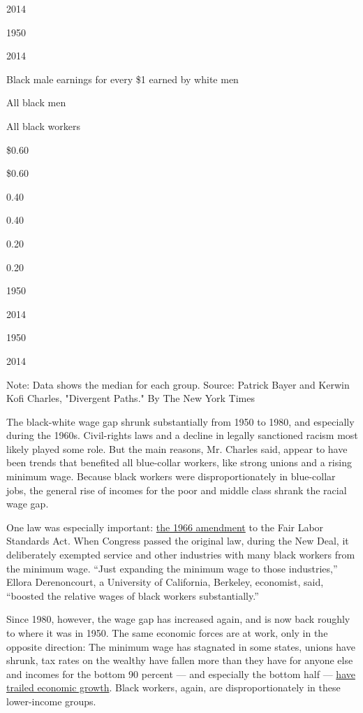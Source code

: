 2014

1950

2014

Black male earnings for every \$1 earned by white men

All black men

All black workers

\$0.60

\$0.60

0.40

0.40

0.20

0.20

1950

2014

1950

2014

Note: Data shows the median for each group. Source: Patrick Bayer and
Kerwin Kofi Charles, "Divergent Paths." \textbar{} By The New York Times

The black-white wage gap shrunk substantially from 1950 to 1980, and
especially during the 1960s. Civil-rights laws and a decline in legally
sanctioned racism most likely played some role. But the main reasons,
Mr. Charles said, appear to have been trends that benefited all
blue-collar workers, like strong unions and a rising minimum wage.
Because black workers were disproportionately in blue-collar jobs, the
general rise of incomes for the poor and middle class shrank the racial
wage gap.

One law was especially important:
\href{https://www.law.cornell.edu/cfr/text/29/779.338}{the 1966
amendment} to the Fair Labor Standards Act. When Congress passed the
original law, during the New Deal, it deliberately exempted service and
other industries with many black workers from the minimum wage. ``Just
expanding the minimum wage to those industries,'' Ellora Derenoncourt, a
University of California, Berkeley, economist, said, ``boosted the
relative wages of black workers substantially.''

Since 1980, however, the wage gap has increased again, and is now back
roughly to where it was in 1950. The same economic forces are at work,
only in the opposite direction: The minimum wage has stagnated in some
states, unions have shrunk, tax rates on the wealthy have fallen more
than they have for anyone else and incomes for the bottom 90 percent ---
and especially the bottom half ---
\href{https://www.nytimes3xbfgragh.onion/2019/02/24/opinion/income-inequality-upper-middle-class.html}{have
trailed economic growth}. Black workers, again, are disproportionately
in these lower-income groups.

